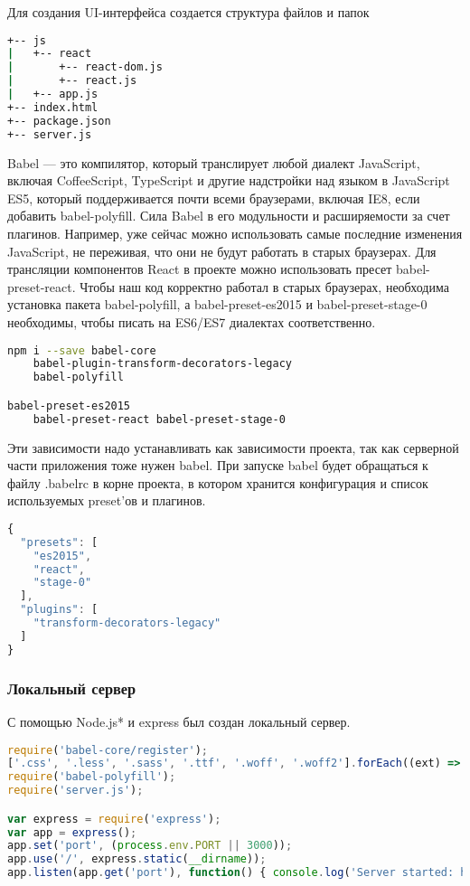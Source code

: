 Для создания UI-интерфейса создается структура файлов и папок

\begin{lstlisting}[language=bash, label=lst:domain:typescript]
+-- js 
|   +-- react 
|       +-- react-dom.js 
|       +-- react.js 
|   +-- app.js 
+-- index.html 
+-- package.json 
+-- server.js
\end{lstlisting}

Babel — это компилятор, который транслирует любой диалект JavaScript, включая CoffeeScript, TypeScript и другие надстройки над языком в 
JavaScript ES5, который поддерживается почти всеми браузерами, включая IE8, если добавить babel-polyfill. Сила Babel в его модульности и расширяемости 
за счет плагинов. Например, уже сейчас можно использовать самые последние изменения JavaScript, не переживая, что они не будут работать в старых браузерах.
Для трансляции компонентов React в проекте можно использовать пресет babel-preset-react. Чтобы наш код корректно работал в старых браузерах, необходима установка 
пакета babel-polyfill, а babel-preset-es2015 и babel-preset-stage-0 необходимы, чтобы писать на ES6/ES7 диалектах соответственно.

\begin{lstlisting}[language=bash, label=lst:domain:typescript]
npm i --save babel-core
    babel-plugin-transform-decorators-legacy
    babel-polyfill 

babel-preset-es2015
    babel-preset-react babel-preset-stage-0
\end{lstlisting}

Эти зависимости надо устанавливать как зависимости проекта, так как серверной части приложения тоже нужен babel.
При запуске babel будет обращаться к файлу .babelrc в корне проекта, в котором хранится конфигурация и список используемых preset'ов и плагинов.

\begin{lstlisting}[language=TypeScript, label=lst:domain:typescript]
{
  "presets": [
    "es2015",
    "react",
    "stage-0"
  ],
  "plugins": [
    "transform-decorators-legacy"
  ]
}
\end{lstlisting}

\subsubsection{Локальный сервер} 

С помощью Node.js* и express был создан локальный сервер. 

\begin{lstlisting}[language=TypeScript, label=lst:domain:typescript]
require('babel-core/register');
['.css', '.less', '.sass', '.ttf', '.woff', '.woff2'].forEach((ext) => require.extensions[ext] = () => {});
require('babel-polyfill');
require('server.js'); 

var express = require('express'); 
var app = express(); 
app.set('port', (process.env.PORT || 3000)); 
app.use('/', express.static(__dirname)); 
app.listen(app.get('port'), function() { console.log('Server started: http://localhost:' + app.get('port') + '/'); });
\end{lstlisting}

